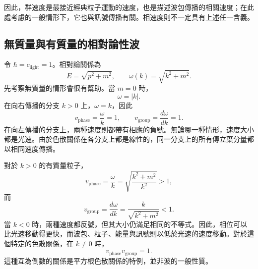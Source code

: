 \begin{classroomqa}
\end{classroomqa}

因此，群速度是最接近經典粒子運動的速度，也是描述波包傳播的相關速度；在此處考慮的一般情形下，它也與訊號傳播有關。相速度則不一定具有上述任一含義。

\subsection{無質量與有質量的相對論性波}

\begin{classroomqa}
\end{classroomqa}

\begin{classroomqa}
\end{classroomqa}

令 \(\hbar=c_{\mathrm{light}}=1\)。相對論關係為
\begin{equation}
E=\sqrt{p^2+m^2},
\qquad
\omega(k)=\sqrt{k^2+m^2}.
\end{equation}
先考察無質量的情形會很有幫助。當 \(m=0\) 時，
\begin{equation}
\omega=|k|.
\end{equation}
在向右傳播的分支 \(k>0\) 上，\(\omega=k\)，因此
\begin{equation}
v_{\mathrm{phase}}=\frac{\omega}{k}=1,
\qquad
v_{\mathrm{group}}=\frac{d\omega}{dk}=1.
\end{equation}
在向左傳播的分支上，兩種速度則都帶有相應的負號。無論哪一種情形，速度大小都是光速。由於色散關係在各分支上都是線性的，同一分支上的所有傅立葉分量都以相同速度傳播。

對於 \(k>0\) 的有質量粒子，
\begin{equation}
v_{\mathrm{phase}}
=\frac{\omega}{k}
=\sqrt{\frac{k^2+m^2}{k^2}}>1,
\end{equation}
而
\begin{equation}
v_{\mathrm{group}}
=\frac{d\omega}{dk}
=\frac{k}{\sqrt{k^2+m^2}}<1.
\end{equation}
當 \(k<0\) 時，兩種速度都反號，但其大小仍滿足相同的不等式。因此，相位可以比光速移動得更快，而波包、粒子、能量與訊號則以低於光速的速度移動。對於這個特定的色散關係，在 \(k\neq0\) 時，
\begin{equation}
v_{\mathrm{phase}}v_{\mathrm{group}}=1.
\end{equation}
這種互為倒數的關係是平方根色散關係的特例，並非波的一般性質。

